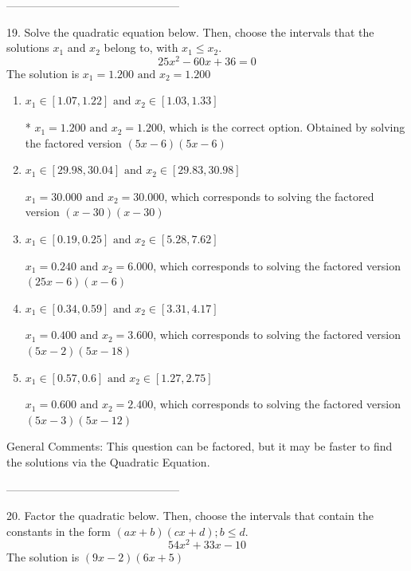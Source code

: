 \documentclass{article}[14pt]
\begin{document}
-----------------------------------------------

19. Solve the quadratic equation below. Then, choose the intervals that the solutions $x_1$ and $x_2$ belong to, with $x_1 \leq x_2$.
$$ 25x^{2} -60 x + 36 = 0 $$ 
The solution is $ x_1 = 1.200 \text{ and } x_2 = 1.200 $ 

\begin{enumerate}[label=\Alph*.] 
\item $ x_1 \in [1.07, 1.22] \text{ and } x_2 \in [1.03, 1.33] $ 

 * $x_1 = 1.200 \text{ and } x_2 = 1.200$, which is the correct option. Obtained by solving the factored version $(5x -6)(5x -6)$ 
\item $ x_1 \in [29.98, 30.04] \text{ and } x_2 \in [29.83, 30.98] $ 

 $x_1 = 30.000 \text{ and } x_2 = 30.000$, which corresponds to solving the factored version $(x -30)(x -30)$ 
\item $ x_1 \in [0.19, 0.25] \text{ and } x_2 \in [5.28, 7.62] $ 

 $x_1 = 0.240 \text{ and } x_2 = 6.000$, which corresponds to solving the factored version $(25x -6)(x -6)$ 
\item $ x_1 \in [0.34, 0.59] \text{ and } x_2 \in [3.31, 4.17] $ 

 $x_1 = 0.400 \text{ and } x_2 = 3.600$, which corresponds to solving the factored version $(5x -2)(5x -18)$ 
\item $ x_1 \in [0.57, 0.6] \text{ and } x_2 \in [1.27, 2.75] $ 

 $x_1 = 0.600 \text{ and } x_2 = 2.400$, which corresponds to solving the factored version $(5x -3)(5x -12)$ 
\end{enumerate} 
 
General Comments: This question can be factored, but it may be faster to find the solutions via the Quadratic Equation.

-----------------------------------------------

20. Factor the quadratic below. Then, choose the intervals that contain the constants in the form $(ax+b)(cx+d); b \leq d.$
$$ 54x^{2} +33 x -10 $$ 
The solution is $ (9x -2)(6x + 5) $ 
\end{document}
